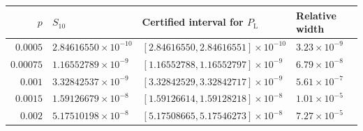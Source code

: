 \begin{tabular}{rlll}
\toprule
$p$ & $S_{10}$ & Certified interval for $P_{\mathrm L}$ & Relative width \\
\midrule
$0.0005$ & $2.84616550\times10^{-10}$ & $[2.84616550,2.84616551]\times10^{-10}$ & $3.23\times10^{-9}$ \\
$0.00075$ & $1.16552789\times10^{-9}$ & $[1.16552788,1.16552797]\times10^{-9}$ & $6.79\times10^{-8}$ \\
$0.001$ & $3.32842537\times10^{-9}$ & $[3.32842529,3.32842717]\times10^{-9}$ & $5.61\times10^{-7}$ \\
$0.0015$ & $1.59126679\times10^{-8}$ & $[1.59126614,1.59128218]\times10^{-8}$ & $1.01\times10^{-5}$ \\
$0.002$ & $5.17510198\times10^{-8}$ & $[5.17508665,5.17546273]\times10^{-8}$ & $7.27\times10^{-5}$ \\
\bottomrule
\end{tabular}
